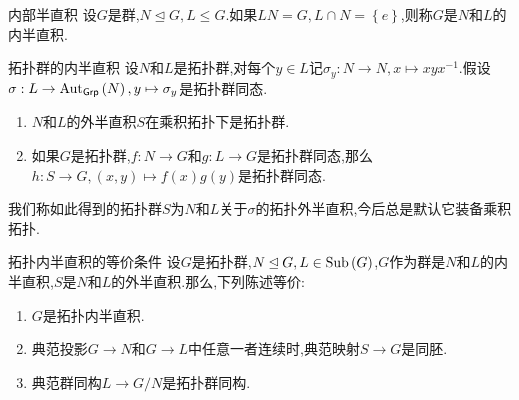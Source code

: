 \begin{definition}{内部半直积}{}
	设$G$是群,$N\unlhd G,L\leq G$.如果$LN=G,L\cap N=\left\{e\right\}$,则称$G$是$N$和$L$的内半直积.
\end{definition}

\begin{proposition}{拓扑群的内半直积}{}
	设$N$和$L$是拓扑群,对每个$y\in L$记$\sigma_{y}:N\to N,x\mapsto xyx^{-1}$.假设$\sigma:L\to\operatorname{Aut}_{\mathsf{Grp}}\left(N\right),y\mapsto\sigma_{y}$是拓扑群同态.
	\begin{enumerate}
		\item $N$和$L$的外半直积$S$在乘积拓扑下是拓扑群.
		\item 如果$G$是拓扑群,$f:N\to G$和$g:L\to G$是拓扑群同态,那么$h:S\to G,\left(x,y\right)\mapsto f\left(x\right)g\left(y\right)$是拓扑群同态.
	\end{enumerate}
\end{proposition}

\begin{convention}{}{}
	我们称如此得到的拓扑群$S$为$N$和$L$关于$\sigma$的拓扑外半直积,今后总是默认它装备乘积拓扑.
\end{convention}

\begin{proposition}{拓扑内半直积的等价条件}{}
	设$G$是拓扑群,$N\unlhd G,L\in\operatorname{Sub}\left(G\right)$,$G$作为群是$N$和$L$的内半直积,$S$是$N$和$L$的外半直积.那么,下列陈述等价:
	\begin{enumerate}
		\item $G$是拓扑内半直积.
		\item 典范投影$G\to N$和$G\to L$中任意一者连续时,典范映射$S\to G$是同胚.
		\item 典范群同构$L\to G/N$是拓扑群同构.
	\end{enumerate}
\end{proposition}

























